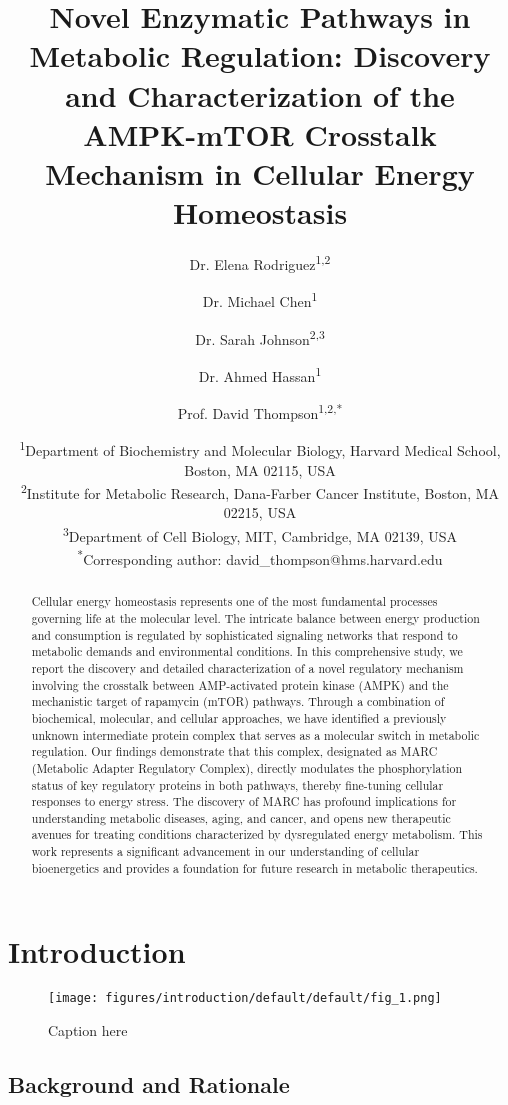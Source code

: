 \documentclass[11pt,a4paper]{article}
\title{Novel Enzymatic Pathways in Metabolic Regulation: Discovery and Characterization of the AMPK-mTOR Crosstalk Mechanism in Cellular Energy Homeostasis}
\author{Dr. Elena Rodriguez\textsuperscript{1,2} \and 
        Dr. Michael Chen\textsuperscript{1} \and 
        Dr. Sarah Johnson\textsuperscript{2,3} \and 
        Dr. Ahmed Hassan\textsuperscript{1} \and 
        Prof. David Thompson\textsuperscript{1,2,*}}
\date{\textsuperscript{1}Department of Biochemistry and Molecular Biology, Harvard Medical School, Boston, MA 02115, USA\\
\textsuperscript{2}Institute for Metabolic Research, Dana-Farber Cancer Institute, Boston, MA 02215, USA\\
\textsuperscript{3}Department of Cell Biology, MIT, Cambridge, MA 02139, USA\\
\textsuperscript{*}Corresponding author: david\_thompson@hms.harvard.edu}
\begin{document}
\maketitle

\begin{abstract}
Cellular energy homeostasis represents one of the most fundamental processes governing life at the molecular level. The intricate balance between energy production and consumption is regulated by sophisticated signaling networks that respond to metabolic demands and environmental conditions. In this comprehensive study, we report the discovery and detailed characterization of a novel regulatory mechanism involving the crosstalk between AMP-activated protein kinase (AMPK) and the mechanistic target of rapamycin (mTOR) pathways. Through a combination of biochemical, molecular, and cellular approaches, we have identified a previously unknown intermediate protein complex that serves as a molecular switch in metabolic regulation. Our findings demonstrate that this complex, designated as MARC (Metabolic Adapter Regulatory Complex), directly modulates the phosphorylation status of key regulatory proteins in both pathways, thereby fine-tuning cellular responses to energy stress. The discovery of MARC has profound implications for understanding metabolic diseases, aging, and cancer, and opens new therapeutic avenues for treating conditions characterized by dysregulated energy metabolism. This work represents a significant advancement in our understanding of cellular bioenergetics and provides a foundation for future research in metabolic therapeutics.
\end{abstract}

\newpage

\tableofcontents

\newpage

\section{Introduction}


\begin{figure}[h!]
    \centering
    \texttt{[image: figures/introduction/default/default/fig\_1.png]}
    \caption{Caption here}
    \label{fig:introduction_default_1}
\end{figure}


\subsection{Background and Rationale}
\end{document}
